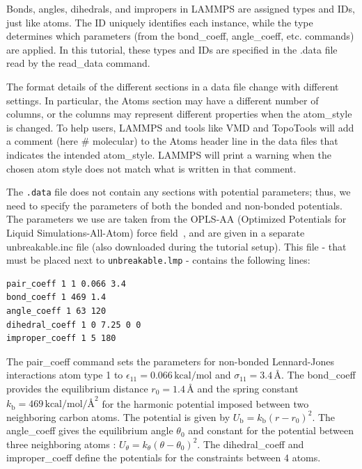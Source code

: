 \documentclass[9pt,tutorial]{livecoms}
\newcommand{\lmpcmd}[1]{\hspace{0pt}\colorbox{listing}{\textcolor{command}{\small{#1}}}\hspace{0pt}} %
\newcommand{\flecmd}[1]{\textcolor{command}{\texttt{#1}}} %
\begin{document}
\begin{note}
{\color{blue}
Bonds, angles, dihedrals, and impropers in LAMMPS are assigned types and IDs, just like atoms.
The ID uniquely identifies each instance, while the type determines which parameters
(from the \lmpcmd{bond\_coeff}, \lmpcmd{angle\_coeff}, etc. commands) are applied.
In this tutorial, these types and IDs are specified in the \lmpcmd{.data} file
read by the \lmpcmd{read\_data} command.}
\end{note}

\begin{note}
The format details of the
different sections in a data file change with different settings.  In
particular, the \lmpcmd{Atoms} section may have a different number of
columns, or the columns may represent different properties when the
\lmpcmd{atom\_style} is changed.  To help users, LAMMPS and tools like
VMD and TopoTools will add a comment (here \lmpcmd{\# molecular}) to the
\lmpcmd{Atoms} header line in the data files that indicates the intended
\lmpcmd{atom\_style}.  LAMMPS will print a warning when the chosen atom
style does not match what is written in that comment.
\end{note}

The \flecmd{.data} file does not contain any sections with potential parameters; thus,
we need to specify the parameters of both the bonded and
non-bonded potentials.  The parameters we use are taken
from the OPLS-AA (Optimized Potentials for Liquid Simulations-All-Atom)
force field~\cite{jorgensenDevelopmentTestingOPLS1996}, and are given
in a separate \lmpcmd{unbreakable.inc} file (also downloaded during
the tutorial setup).  This file - that must be placed
next to \flecmd{unbreakable.lmp} - contains the following lines:
\begin{lstlisting}
pair_coeff 1 1 0.066 3.4
bond_coeff 1 469 1.4
angle_coeff 1 63 120
dihedral_coeff 1 0 7.25 0 0
improper_coeff 1 5 180
\end{lstlisting}
The \lmpcmd{pair\_coeff} command sets the parameters for non-bonded
Lennard-Jones interactions atom type 1 to
$\epsilon_{11} = 0.066 \, \text{kcal/mol}$ and
$\sigma_{11} = 3.4 \, \text{\AA{}}$.  The \lmpcmd{bond\_coeff} provides
the equilibrium distance $r_0= 1.4 \, \text{\AA{}}$ and the
spring constant $k_\text{b} = 469 \, \text{kcal/mol/\AA{}}^2$ for the
harmonic potential imposed between two neighboring carbon atoms.  The potential
is given by $U_\text{b} = k_\text{b} ( r - r_0)^2$.  The
\lmpcmd{angle\_coeff} gives the equilibrium angle $\theta_0$ and
constant for the potential between three neighboring atoms :
$U_\theta = k_\theta ( \theta - \theta_0)^2$.  The
\lmpcmd{dihedral\_coeff} and \lmpcmd{improper\_coeff} define the potentials
for the constraints between 4 atoms.
\end{document}
